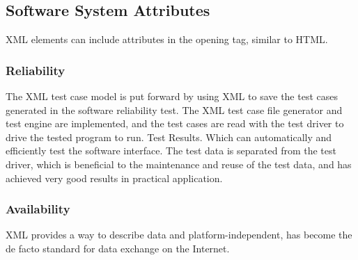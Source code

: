 \subsection{Software System Attributes}
XML elements can include attributes in the opening tag, similar to HTML.

\subsubsection{Reliability}

The XML test case model is put forward by using XML to save the test cases generated in the software reliability test. 
The XML test case file generator and test engine are implemented, and the test cases are read with the test driver to drive the tested program to run. 
Test Results. Which can automatically and efficiently test the software interface. The test data is separated from the test driver, 
which is beneficial to the maintenance and reuse of the test data, and has achieved very good results in practical application.


\subsubsection{Availability}

XML provides a way to describe data and platform-independent,
has become the de facto standard for data exchange on the Internet.


